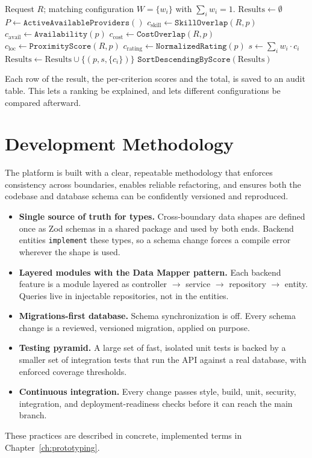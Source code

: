 \begin{algorithm}[H]
	\small
	\caption{$(\text{Ranked}) \gets \texttt{MatchProviders}(R, W)$}
	\label{alg:match}
	\begin{algorithmic}[1]
		\Require Request $R$; matching configuration $W = \{w_i\}$ with $\sum_i w_i = 1$.
		\State $\text{Results} \gets \emptyset$
		\State $P \gets \texttt{ActiveAvailableProviders}()$
			\State $c_\text{skill} \gets \texttt{SkillOverlap}(R, p)$
			\State $c_\text{avail} \gets \texttt{Availability}(p)$
			\State $c_\text{cost} \gets \texttt{CostOverlap}(R, p)$
			\State $c_\text{loc} \gets \texttt{ProximityScore}(R, p)$ 
			\State $c_\text{rating} \gets \texttt{NormalizedRating}(p)$
			\State $s \gets \sum_{i} w_i \cdot c_i$ 
			\State $\text{Results} \gets \text{Results} \cup \{(p, s, \{c_i\})\}$
		\EndFor
		\State \Return $\texttt{SortDescendingByScore}(\text{Results})$
	\end{algorithmic}
\end{algorithm}

Each row of the result, the per-criterion scores and the total, is saved to an
audit table. This lets a ranking be explained, and lets different configurations
be compared afterward.

\section{Development Methodology}
\label{sec:dev-method}
The platform is built with a clear, repeatable methodology that enforces
consistency across boundaries, enables reliable refactoring, and ensures both
the codebase and database schema can be confidently versioned and reproduced.

\begin{itemize}
	\item \textbf{Single source of truth for types.} Cross-boundary data shapes
	      are defined once as Zod schemas in a shared package and used by both
	      ends. Backend entities \texttt{implement} these types, so a schema change
	      forces a compile error wherever the shape is used.
	\item \textbf{Layered modules with the Data Mapper pattern.} Each backend
	      feature is a module layered as controller $\rightarrow$ service
	      $\rightarrow$ repository $\rightarrow$ entity. Queries live in injectable
	      repositories, not in the entities.
	\item \textbf{Migrations-first database.} Schema synchronization is off. Every
	      schema change is a reviewed, versioned migration, applied on purpose.
	\item \textbf{Testing pyramid.} A large set of fast, isolated unit tests is
	      backed by a smaller set of integration tests that run the API against a
	      real database, with enforced coverage thresholds.
	\item \textbf{Continuous integration.} Every change passes style, build, unit,
	      security, integration, and deployment-readiness checks before it can
	      reach the main branch.
\end{itemize}

These practices are described in concrete, implemented terms in
Chapter~\ref{ch:prototyping}.
